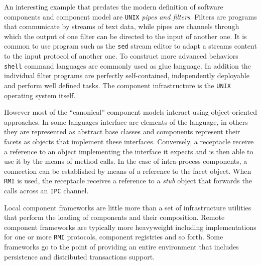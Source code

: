 An interesting example that predates the modern definition of software components and component model are \texttt{UNIX}
\emph{pipes and filters}. Filters are programs that communicate by streams of text data, while pipes are channels through
which the output of one filter can be directed to the input of another one. It is common to use program such as the \texttt{sed}
stream editor to adapt a streams content to the input protocol of another one. To construct more advanced behaviors \texttt{shell}
command languages are commonly used as glue language. In addition the individual filter programs are perfectly self-contained,
independently deployable and perform well defined tasks. The component infrastructure is the \texttt{UNIX} operating system itself.

However most of the ``canonical'' component models interact using object-oriented approaches. In some languages interface are elements
of the language, in others they are represented as abstract
base classes and components represent their facets as objects that implement these interfaces. Conversely, a receptacle
receive a reference to an object implementing the interface it expects and is then able to use it by the means of method calls.
In the case of intra-process components, a connection can be established by means of a reference to the facet object.
When \texttt{RMI} is used, the receptacle receives a reference to a \emph{stub} object that forwards the calls across an \texttt{IPC} channel. 

Local component frameworks are little more than a set of infrastructure utilities that perform the loading of components and their composition.
Remote component frameworks are typically more heavyweight including implementations for one or more \texttt{RMI} protocols, component registries
and so forth. Some frameworks go to the point of providing an entire environment that includes persistence and distributed transactions support.

